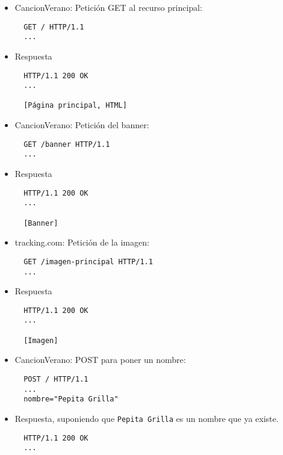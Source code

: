 \begin{itemize}

\item CancionVerano: Petición GET al recurso principal: 

\begin{verbatim}
  GET / HTTP/1.1
  ...
\end{verbatim}

\item Respuesta

\begin{verbatim}
  HTTP/1.1 200 OK
  ...

  [Página principal, HTML]
\end{verbatim}

\item CancionVerano: Petición del banner:

  \begin{verbatim}
  GET /banner HTTP/1.1
  ...
\end{verbatim}

\item Respuesta

\begin{verbatim}
  HTTP/1.1 200 OK
  ...

  [Banner]
\end{verbatim}

\item tracking.com: Petición de la imagen:

  \begin{verbatim}
  GET /imagen-principal HTTP/1.1
  ...
\end{verbatim}

\item Respuesta

\begin{verbatim}
  HTTP/1.1 200 OK
  ...

  [Imagen]
\end{verbatim}

  
\item CancionVerano: POST para poner un nombre:

\begin{verbatim}
  POST / HTTP/1.1
  ...
  nombre="Pepita Grilla"
\end{verbatim}

\item Respuesta, suponiendo que \texttt{Pepita Grilla} es un nombre que ya existe.

\begin{verbatim}
  HTTP/1.1 200 OK
  ...


\end{verbatim}
\end{itemize}
